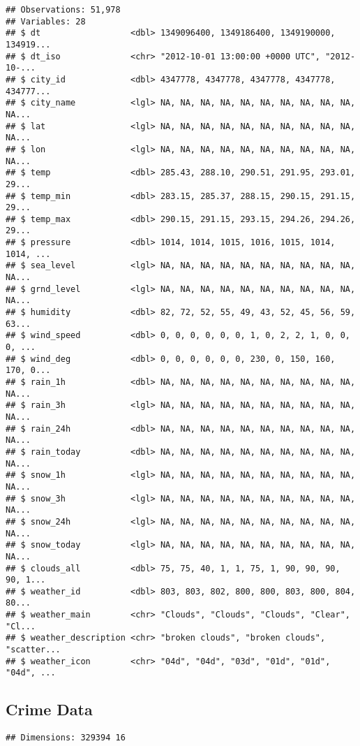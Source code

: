 \documentclass[]{article}
\begin{document}
\begin{verbatim}
## Observations: 51,978
## Variables: 28
## $ dt                  <dbl> 1349096400, 1349186400, 1349190000, 134919...
## $ dt_iso              <chr> "2012-10-01 13:00:00 +0000 UTC", "2012-10-...
## $ city_id             <dbl> 4347778, 4347778, 4347778, 4347778, 434777...
## $ city_name           <lgl> NA, NA, NA, NA, NA, NA, NA, NA, NA, NA, NA...
## $ lat                 <lgl> NA, NA, NA, NA, NA, NA, NA, NA, NA, NA, NA...
## $ lon                 <lgl> NA, NA, NA, NA, NA, NA, NA, NA, NA, NA, NA...
## $ temp                <dbl> 285.43, 288.10, 290.51, 291.95, 293.01, 29...
## $ temp_min            <dbl> 283.15, 285.37, 288.15, 290.15, 291.15, 29...
## $ temp_max            <dbl> 290.15, 291.15, 293.15, 294.26, 294.26, 29...
## $ pressure            <dbl> 1014, 1014, 1015, 1016, 1015, 1014, 1014, ...
## $ sea_level           <lgl> NA, NA, NA, NA, NA, NA, NA, NA, NA, NA, NA...
## $ grnd_level          <lgl> NA, NA, NA, NA, NA, NA, NA, NA, NA, NA, NA...
## $ humidity            <dbl> 82, 72, 52, 55, 49, 43, 52, 45, 56, 59, 63...
## $ wind_speed          <dbl> 0, 0, 0, 0, 0, 0, 1, 0, 2, 2, 1, 0, 0, 0, ...
## $ wind_deg            <dbl> 0, 0, 0, 0, 0, 0, 230, 0, 150, 160, 170, 0...
## $ rain_1h             <dbl> NA, NA, NA, NA, NA, NA, NA, NA, NA, NA, NA...
## $ rain_3h             <lgl> NA, NA, NA, NA, NA, NA, NA, NA, NA, NA, NA...
## $ rain_24h            <dbl> NA, NA, NA, NA, NA, NA, NA, NA, NA, NA, NA...
## $ rain_today          <dbl> NA, NA, NA, NA, NA, NA, NA, NA, NA, NA, NA...
## $ snow_1h             <lgl> NA, NA, NA, NA, NA, NA, NA, NA, NA, NA, NA...
## $ snow_3h             <lgl> NA, NA, NA, NA, NA, NA, NA, NA, NA, NA, NA...
## $ snow_24h            <lgl> NA, NA, NA, NA, NA, NA, NA, NA, NA, NA, NA...
## $ snow_today          <lgl> NA, NA, NA, NA, NA, NA, NA, NA, NA, NA, NA...
## $ clouds_all          <dbl> 75, 75, 40, 1, 1, 75, 1, 90, 90, 90, 90, 1...
## $ weather_id          <dbl> 803, 803, 802, 800, 800, 803, 800, 804, 80...
## $ weather_main        <chr> "Clouds", "Clouds", "Clouds", "Clear", "Cl...
## $ weather_description <chr> "broken clouds", "broken clouds", "scatter...
## $ weather_icon        <chr> "04d", "04d", "03d", "01d", "01d", "04d", ...
\end{verbatim}

\subsection{Crime Data}\label{crime-data}

\begin{verbatim}
## Dimensions: 329394 16
\end{verbatim}
\end{document}
